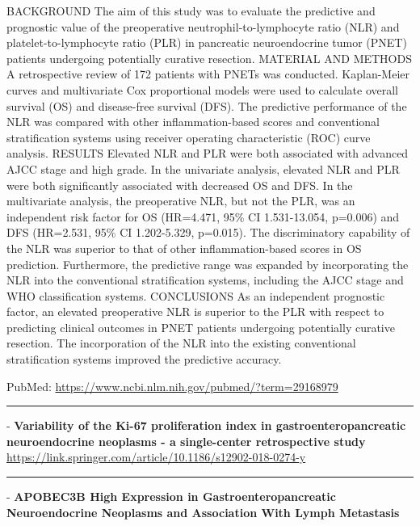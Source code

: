 \documentclass[]{article}
\begin{document}
BACKGROUND The aim of this study was to evaluate the predictive and
prognostic value of the preoperative neutrophil-to-lymphocyte ratio
(NLR) and platelet-to-lymphocyte ratio (PLR) in pancreatic
neuroendocrine tumor (PNET) patients undergoing potentially curative
resection. MATERIAL AND METHODS A retrospective review of 172 patients
with PNETs was conducted. Kaplan-Meier curves and multivariate Cox
proportional models were used to calculate overall survival (OS) and
disease-free survival (DFS). The predictive performance of the NLR was
compared with other inflammation-based scores and conventional
stratification systems using receiver operating characteristic (ROC)
curve analysis. RESULTS Elevated NLR and PLR were both associated with
advanced AJCC stage and high grade. In the univariate analysis, elevated
NLR and PLR were both significantly associated with decreased OS and
DFS. In the multivariate analysis, the preoperative NLR, but not the
PLR, was an independent risk factor for OS (HR=4.471, 95\% CI
1.531-13.054, p=0.006) and DFS (HR=2.531, 95\% CI 1.202-5.329, p=0.015).
The discriminatory capability of the NLR was superior to that of other
inflammation-based scores in OS prediction. Furthermore, the predictive
range was expanded by incorporating the NLR into the conventional
stratification systems, including the AJCC stage and WHO classification
systems. CONCLUSIONS As an independent prognostic factor, an elevated
preoperative NLR is superior to the PLR with respect to predicting
clinical outcomes in PNET patients undergoing potentially curative
resection. The incorporation of the NLR into the existing conventional
stratification systems improved the predictive accuracy.

PubMed: \url{https://www.ncbi.nlm.nih.gov/pubmed/?term=29168979}

{}

{}

\begin{center}\rule{0.5\linewidth}{\linethickness}\end{center}

 - \textbf{Variability of the Ki-67 proliferation index in
gastroenteropancreatic neuroendocrine neoplasms - a single-center
retrospective study}
\url{https://link.springer.com/article/10.1186/s12902-018-0274-y}

\begin{center}\rule{0.5\linewidth}{\linethickness}\end{center}

 - \textbf{APOBEC3B High Expression in Gastroenteropancreatic
Neuroendocrine Neoplasms and Association With Lymph Metastasis}
\end{document}
